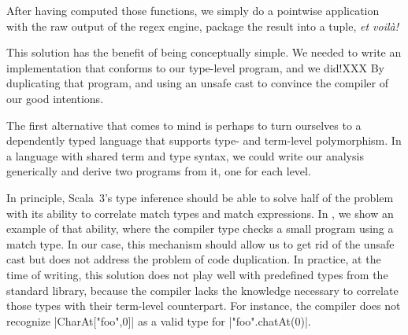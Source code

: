 \regexTermLvlLoop
%

\noindent
After having computed those functions, we simply do a pointwise application with the raw output of the regex engine, package the result into a tuple, \emph{et voilà!}

\regexTransform

This solution has the benefit of being conceptually simple.
We needed to write an implementation that conforms to our type-level program, and we did!XXX
By duplicating that program, and using an unsafe cast to convince the compiler of our good intentions.

The first alternative that comes to mind is perhaps to turn ourselves to a dependently typed language that supports type- and term-level polymorphism.
In a language with shared term and type syntax, we could write our analysis generically and derive two programs from it, one for each level.

In principle, Scala~3's type inference should be able to solve half of the problem with its ability to correlate match types and match expressions.
In , we show an example of that ability, where the compiler type checks a small program using a match type.
In our case, this mechanism should allow us to get rid of the unsafe cast but does not address the problem of code duplication.
In practice, at the time of writing, this solution does not play well with predefined types from the standard library, because the compiler lacks the knowledge necessary to correlate those types with their term-level counterpart.
For instance, the compiler does not recognize |CharAt["foo",0]| as a valid type for |"foo".chatAt(0)|.

